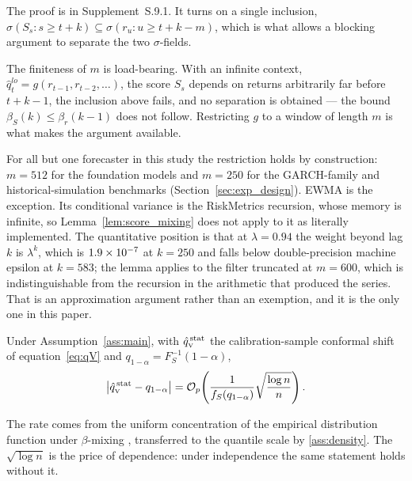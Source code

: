 The proof is in Supplement~S.9.1. It turns on a single inclusion,
$\sigma(S_s: s\ge t+k)\subseteq\sigma(r_u: u\ge t+k-m)$, which is what allows a
blocking argument to separate the two $\sigma$-fields.

\begin{remark}
	\label{rem:finite_context}
	The finiteness of $m$ is load-bearing. With an infinite context,
	$\hat q_t^{lo} = g(r_{t-1}, r_{t-2},\dots)$, the score $S_s$ depends on
	returns arbitrarily far before $t+k-1$, the inclusion above fails, and no
	separation is obtained --- the bound $\beta_S(k)\le\beta_r(k-1)$ does not
	follow. Restricting $g$ to a window of length $m$ is what makes the argument
	available.

	For all but one forecaster in this study the restriction holds by
	construction: $m = 512$ for the foundation models and $m = 250$ for the
	GARCH-family and historical-simulation benchmarks
	(Section~\ref{sec:exp_design}). EWMA is the exception. Its conditional
	variance is the RiskMetrics recursion, whose memory is infinite, so
	Lemma~\ref{lem:score_mixing} does not apply to it as literally implemented.
	The quantitative position is that at $\lambda = 0.94$ the weight beyond lag
	$k$ is $\lambda^{k}$, which is $1.9\times 10^{-7}$ at $k = 250$ and falls below
	double-precision machine epsilon at $k = 583$; the lemma applies to the filter
	truncated at $m = 600$, which is indistinguishable from the recursion in the
	arithmetic that produced the series. That is an approximation argument rather
	than an exemption, and it is the only one in this paper.
\end{remark}

\begin{lemma}
	\label{lem:quantile_mixing}
	Under Assumption~\ref{ass:main}, with $\hat{q}_{\scriptscriptstyle\mathrm{V}}^{\,\mathrm{stat}}$ the calibration-sample
	conformal shift of equation~\eqref{eq:qV} and
	$q_{1-\alpha} = F_S^{-1}(1-\alpha)$,
	\begin{equation}
		\label{eq:quantile_rate}
		\left|\hat{q}_{\scriptscriptstyle\mathrm{V}}^{\,\mathrm{stat}} - q_{1-\alpha}\right|
		=
		\mathcal O_p\!\left(
		\frac{1}{f_S(q_{1-\alpha})}\sqrt{\frac{\log n}{n}}
		\right).
	\end{equation}
\end{lemma}

The rate comes from the uniform concentration of the empirical distribution
function under $\beta$-mixing \citep[Theorem~2.1]{yu1994rates}
\citep[Theorem~7.2]{rio2017asymptotic}, transferred to the quantile scale by
\ref{ass:density}. The $\sqrt{\log n}$ is the price of dependence: under
independence the same statement holds without it.

